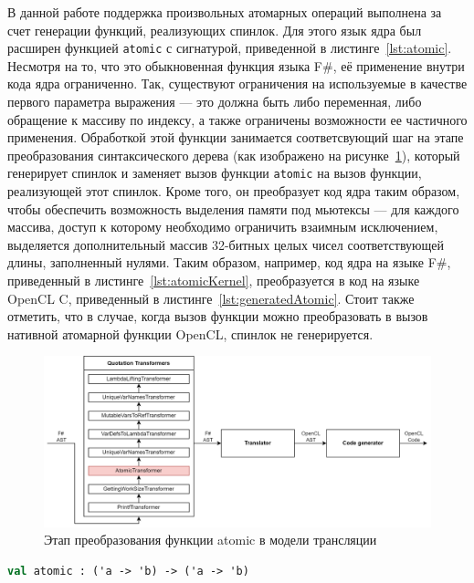 В данной работе поддержка произвольных атомарных операций выполнена за счет генерации функций, реализующих спинлок. Для этого язык ядра был расширен функцией \verb|atomic| с сигнатурой, приведенной в листинге~\ref{lst:atomic}. Несмотря на то, что это обыкновенная функция языка F\#, её применение внутри кода ядра ограниченно. Так, существуют ограничения на используемые в качестве первого параметра выражения --- это должна быть либо переменная, либо обращение к массиву по индексу, а также ограничены возможности ее частичного применения. Обработкой этой функции занимается соответсвующий шаг на этапе преобразования синтаксического дерева (как изображено на рисунке~\ref{fig:transl2}), который генерирует спинлок и заменяет вызов функции \verb|atomic| на вызов функции, реализующей этот спинлок. Кроме того, он преобразует код ядра таким образом, чтобы обеспечить возможность выделения памяти под мьютексы --- для каждого массива, доступ к которому необходимо ограничить взаимным исключением, выделяется дополнительный массив 32-битных целых чисел соответствующей длины, заполненный нулями. Таким образом, например, код ядра на языке F\#, приведенный в листинге~\ref{lst:atomicKernel}, преобразуется в код на языке OpenCL C, приведенный в листинге~\ref{lst:generatedAtomic}. Стоит также отметить, что в случае, когда вызов функции  можно преобразовать в вызов нативной атомарной функции OpenCL, спинлок не генерируется.

\begin{figure}[h!]
\centering
\includegraphics[scale=0.25]{pictures/Modified.png}
\caption{Этап преобразования функции atomic в модели трансляции}
\label{fig:transl2}
\end{figure}

\newpage

\begin{lstlisting}[caption=Сигнатура функции atomic, language=Caml, frame=single, label={lst:atomic}]
val atomic : ('a -> 'b) -> ('a -> 'b)
\end{lstlisting}

